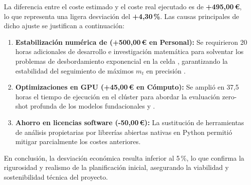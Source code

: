 La diferencia entre el coste estimado y el coste real ejecutado es de \textbf{+495,00\,\euro}, lo que representa una ligera desviación del \textbf{+4,30\,\%}. Las causas principales de dicho ajuste se justifican a continuación:
\begin{enumerate}
    \item \textbf{Estabilización numérica de \slstm{} (+500,00\,\euro{} en Personal):} Se requirieron 20 horas adicionales de desarrollo e investigación matemática para solventar los problemas de desbordamiento exponencial en la celda \slstm{}, garantizando la estabilidad del seguimiento de máximos $m_t$ en precisión .
    \item \textbf{Optimizaciones en GPU (+45,00\,\euro{} en Cómputo):} Se amplió en 37,5 horas el tiempo de ejecución en el clúster para abordar la evaluación zero-shot profunda de los modelos fundacionales \chronos{} y \timesfm{}.
    \item \textbf{Ahorro en licencias software (-50,00\,\euro{}):} La sustitución de herramientas de análisis propietarias por librerías abiertas nativas en Python permitió mitigar parcialmente los costes anteriores.
\end{enumerate}

En conclusión, la desviación económica resulta inferior al 5\,\%, lo que confirma la rigurosidad y realismo de la planificación inicial, asegurando la viabilidad y sostenibilidad técnica del proyecto.


